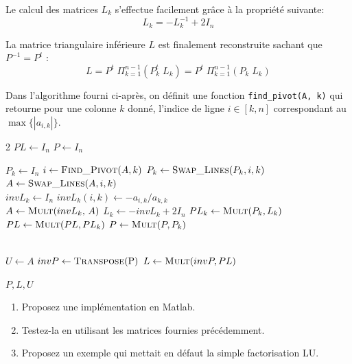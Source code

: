 \documentclass[a4paper, 10pt]{article}
\begin{document}
Le calcul des matrices $L_k$ s'effectue facilement grâce à la propriété suivante:
 \begin{equation}
 L_k=-L_k^{-1}+2I_n
 \end{equation}
 
 
 La matrice triangulaire inférieure $L$ est finalement reconstruite sachant que $P^{-1}=P^t$ :
  \begin{equation}
 L= P^t\;  \Pi_{k=1}^{n-1}  (P_k^t \; L_k) = P^t\;  \Pi_{k=1}^{n-1}  (P_k \; L_k)
 \end{equation}

 
Dans l'algorithme fourni ci-après, on définit une fonction {\tt find\_pivot(A, k)}
qui retourne pour une colonne $k$ donné, l'indice de ligne $i \in [k, n]$  
correspondant au $\max \{|a_{i,k}|\}$.

\begin{algorithmic}[1]
   \begin{multicols}{2}
    \State $PL \gets I_n $
    \State $P \gets I_n $
    
        \State $P_k \gets I_n $
        \State $i \gets \Call{Find\_Pivot}{$$A, k$$} $
        \State $P_k \gets \Call{Swap\_Lines}{$$P_k,i, k$$} $
        \State $A \gets \Call{Swap\_Lines}{$$A,i, k$$} $ \\
        \State $invL_k \gets I_n$ 
                    \State $invL_k(i,k) \gets -a_{i,k}/a_{k,k} $
            \EndFor \\
        \State $A \gets \Call{Mult}{$$invL_k$, $A$$} $   
        \State $L_k \gets -invL_k + 2 I_n $
        \State $PL_k \gets  \Call{Mult}{$$P_k, L_k$$} $
        \State $PL \gets \Call{Mult}{$$PL, PL_k$$} $    
        \State $P \gets \Call{Mult}{$$P, P_k$$} $ 
                 
      \EndFor\\

      \State $U \gets A $
      \State $invP \gets \Call{Transpose}{$P$} $
      \State $L \gets \Call{Mult}{$$invP, PL$$} $ 
                                
    \State \Return $P, L, U$

\EndFunction
\end{multicols}
\end{algorithmic}

  \begin{enumerate} 
 \item Proposez une implémentation en Matlab.
 \item Testez-la en utilisant les matrices fournies précédemment.
 \item Proposez un exemple qui mettait en défaut la simple factorisation LU.
  \end{enumerate} 
 
\end{document}
